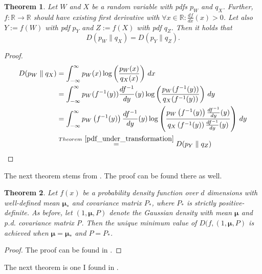 \documentclass{article}
\newtheorem{theorem}{Theorem}[section]
\begin{document}
\begin{theorem}
\label{invariance-under-transformation}
Let $W$ and $X$ be a random variable with pdfs $p_{W}$ and $q_{X}$. Further, $f:\mathbb{R} \rightarrow \mathbb{R}$ should have existing first derivative with $\forall x \in \mathbb{R}: \frac{df}{dx}(x) > 0$. Let also $Y := f(W)$ with pdf $p_{Y}$ and $Z := f(X)$ with pdf $q_{Z}$. Then it holds that 
\begin{equation}
    D(p_{W} \parallel q_{X}) = D(p_{Y} \parallel q_{Z}) \text{.}
\end{equation}
\end{theorem}

\begin{proof}
\begin{align*}
     D(p_{W} \parallel q_{X}) &= \int _{-\infty }^{\infty }p_{W}(x)\log \left({\frac {p_{W}(x)}{q_{X}(x)}}\right)\,dx  \\
     &= \int _{-\infty }^{\infty }p_{W}(f^{-1}(y)) \frac{df^{-1}}{dy}(y) \log \left({\frac {p_{W}(f^{-1}(y))}{q_{X}(f^{-1}(y))}}\right)\,dy \\ 
     &= \int _{-\infty }^{\infty }p_{W}\left(f^{-1}(y)\right) \frac{df^{-1}}{dy}(y) \log \left({\frac {p_{W}\left(f^{-1}(y)\right) \frac{df^{-1}}{dy}(y) }{q_{X}\left(f^{-1}(y)\right) \frac{df^{-1}}{dy}(y)}}\right)\,dy \\
     &\stackrel{Theorem\ \ref{pdf_under_transformation}}{=} D(p_{Y} \parallel q_{Z})
\end{align*}
   
\end{proof}

The next theorem stems from \cite{runnalls}. The proof can be found there as well.

\begin{theorem}
\label{k-l-div-min-gauss}
Let $f(x)$ be a probability density function over $d$ dimensions with well-defined mean $\bm{\mu_{*}}$ and covariance matrix $P_{*}$, where $P_{*}$ is strictly positive-definite. As before, let $(1,\bm{\mu}, P)$ denote the Gaussian density with mean $\bm{\mu}$ and p.d. covariance matrix P. Then the unique minimum value of $D(f,(1,\bm{\mu},P)$ is achieved when $\bm{\mu} = \bm{\mu_{*}}$ and $P = P_{*}$.
\end{theorem}
\begin{proof}
The proof can be found in \cite{runnalls}.
\end{proof}

The next theorem is one I found in \cite{mixture_distribution}.
\end{document}
